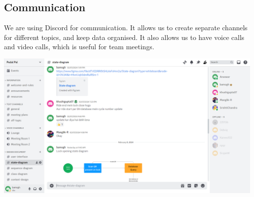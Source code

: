 \documentclass[11pt]{article}
\begin{document}
\subsection{Communication}
We are using Discord for communication. It allows us to create separate channels for different topics, and keep data organised. It also allows us to have voice calls and video calls, which is useful for team meetings.
\begin{center}
  \includegraphics[scale=0.3]{project-plan-images/communication.png}
\end{center}

\end{document}
